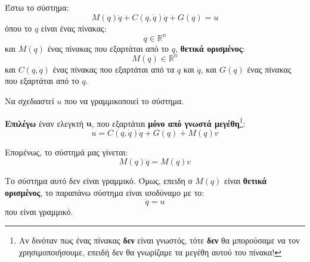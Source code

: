 \documentclass[11pt,a4paper,notitlepage,fleqn]{article}
\begin{document}
\begin{exercise}
	Έστω το σύστημα:
	\[
	M(q)\ddot q +C(q,\dot q)\dot q + G(q) = u
	\]
	όπου το \( q \) είναι ένας πίνακας:
	\[
	q \in \mathbb R^n
	\]
	και \( M(q) \) ένας πίνακας που εξαρτάται από το \( q \), \textbf{θετικά ορισμένος}:
	\[
	M(q) \in \mathbb R^n
	\]
	και \( C(q,\dot q) \) ένας πίνακας που εξαρτάται από τα \( q \) και
	\( \dot q \), και \( G(q) \) ένας πίνακας που εξαρτάται από το \( q \).

	Να σχεδιαστεί \( u \) που να γραμμικοποιεί το σύστημα.

	\tcblower
	\textbf{Επιλέγω} έναν ελεγκτή \( \textbf{u} \), που εξαρτάται
	\textbf{μόνο από γνωστά μεγέθη}\footnote{Αν δινόταν πως ένας πίνακας
		\textbf{δεν} είναι γνωστός, τότε \textbf{δεν} θα μπορούσαμε
		να τον χρησιμοποιήσουμε, επειδή δεν θα γνωρίζαμε τα μεγέθη
		αυτού του πίνακα!}:
	\[
	u = C(q,\dot q)\dot q + G(q) + M(q) v
	\]

	Επομένως, το σύστημά μας γίνεται:
	\[
	M(q)\ddot q = M(q) v
	\]

	Το σύστημα αυτό δεν είναι γραμμικό. Όμως, επειδη ο \( M(q) \) είναι
	\textbf{θετικά ορισμένος}, το παραπάνω σύστημα είναι ισοδύναμο με το:
	\[
	\ddot q = u
	\]
	που είναι γραμμικό.
\end{exercise}
\end{document}
